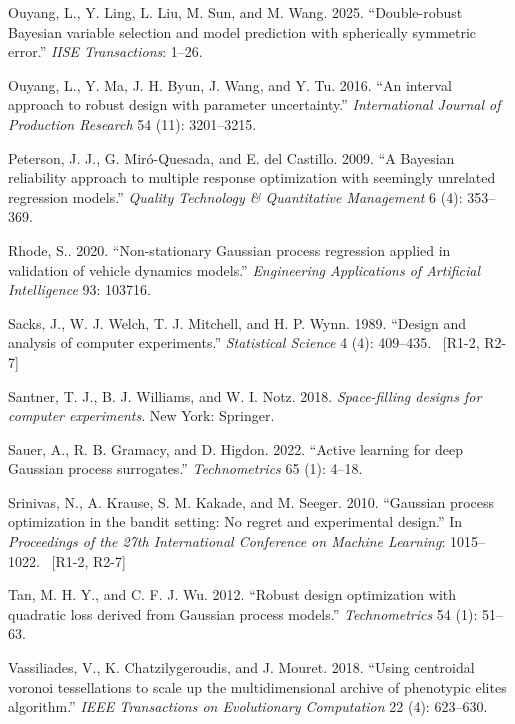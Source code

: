 \documentclass[]{interact}
\DeclareRobustCommand{\reviewadd}[2]{{\color{red}#1}\ {\color{blue}\footnotesize[#2]}}
\theoremstyle{plain}%
\theoremstyle{definition}
\theoremstyle{remark}
\begin{document}
\begin{thebibliography}{}
Ouyang, L., Y. Ling, L. Liu, M. Sun, and M. Wang. 2025. ``Double-robust Bayesian variable selection and model prediction with spherically symmetric error.'' \emph{IISE Transactions}: 1--26.

Ouyang, L., Y. Ma, J. H. Byun, J. Wang, and Y. Tu. 2016. ``An interval approach to robust design with parameter uncertainty.'' \emph{International Journal of Production Research} 54 (11): 3201--3215.

Peterson, J. J., G. Mir{\'o}-Quesada, and E. del Castillo. 2009. ``A Bayesian reliability approach to multiple response optimization with seemingly unrelated regression models.'' \emph{Quality Technology \& Quantitative Management} 6 (4): 353--369.

Rhode, S.. 2020. ``Non-stationary Gaussian process regression applied in validation of vehicle dynamics models.'' \emph{Engineering Applications of Artificial Intelligence} 93: 103716.

\reviewadd{
Sacks, J., W. J. Welch, T. J. Mitchell, and H. P. Wynn. 1989. ``Design and analysis of computer experiments.'' \emph{Statistical Science} 4 (4): 409--435.
}{R1-2, R2-7}

Santner, T. J., B. J. Williams, and W. I. Notz. 2018. \emph{Space-filling designs for computer experiments}. New York: Springer.

Sauer, A., R. B. Gramacy, and D. Higdon. 2022. ``Active learning for deep Gaussian process surrogates.'' \emph{Technometrics} 65 (1): 4--18.

\reviewadd{
Srinivas, N., A. Krause, S. M. Kakade, and M. Seeger. 2010. ``Gaussian process optimization in the bandit setting: No regret and experimental design.'' In \emph{Proceedings of the 27th International Conference on Machine Learning}: 1015--1022.
}{R1-2, R2-7}

Tan, M. H. Y., and C. F. J. Wu. 2012. ``Robust design optimization with quadratic loss derived from Gaussian process models.'' \emph{Technometrics} 54 (1): 51--63.

Vassiliades, V., K. Chatzilygeroudis, and J. Mouret. 2018. ``Using centroidal voronoi tessellations to scale up the multidimensional archive of phenotypic elites algorithm.'' \emph{IEEE Transactions on Evolutionary Computation} 22 (4): 623--630.


\end{thebibliography}
\end{document}
